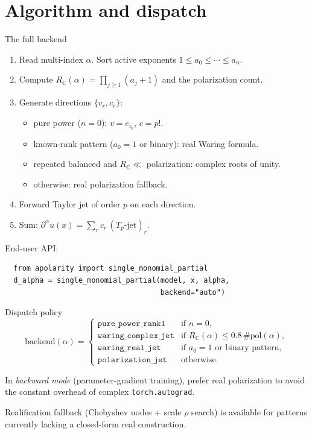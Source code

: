 \documentclass[10pt,aspectratio=169]{beamer}
\newcommand{\C}{\mathbb{C}}
\newcommand{\Tp}{T_p}
\newcommand{\dal}{\partial^\alpha}
\begin{document}
\section{Algorithm and dispatch}

\begin{frame}[fragile]{The full backend}
\begin{enumerate}
  \item Read multi-index $\alpha$. Sort active exponents
        $1\le a_0\le\cdots\le a_n$.
  \item Compute $R_\C(\alpha)=\prod_{j\ge1}(a_j+1)$ and the polarization count.
  \item Generate directions $\{v_r,c_r\}$:
        \begin{itemize}
          \item pure power ($n=0$): $v=e_{i_0}$, $c=p!$.
          \item known-rank pattern ($a_0=1$ or binary): real Waring formula.
          \item repeated balanced and $R_\C\ll$ polarization: complex roots
                of unity.
          \item otherwise: real polarization fallback.
        \end{itemize}
  \item Forward Taylor jet of order $p$ on each direction.
  \item Sum: $\dal u(x) = \sum_r c_r\,(\Tp\text{-jet})_r$.
\end{enumerate}

\medskip
End-user API:
\begin{verbatim}
  from apolarity import single_monomial_partial
  d_alpha = single_monomial_partial(model, x, alpha,
                                    backend="auto")
\end{verbatim}
\end{frame}

\begin{frame}{Dispatch policy}
  \[
    \mathrm{backend}(\alpha) =
    \begin{cases}
      \texttt{pure\_power\_rank1}     & \text{if } n=0,\\[2pt]
      \texttt{waring\_complex\_jet}   & \text{if } R_\C(\alpha) \le 0.8\,\#\mathrm{pol}(\alpha),\\[2pt]
      \texttt{waring\_real\_jet}      & \text{if } a_0=1 \text{ or binary pattern},\\[2pt]
      \texttt{polarization\_jet}      & \text{otherwise}.
    \end{cases}
  \]

  \medskip
  In \emph{backward mode} (parameter-gradient training), prefer real
  polarization to avoid the constant overhead of complex
  \texttt{torch.autograd}.

  \medskip
  Realification fallback (Chebyshev nodes + scale $\rho$ search) is
  available for patterns currently lacking a closed-form real construction.
\end{frame}
\end{document}
